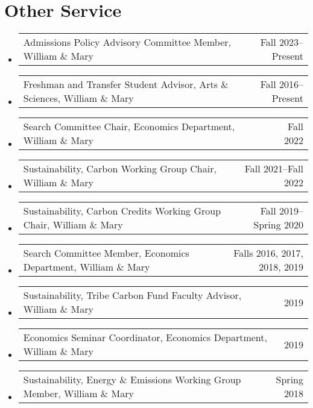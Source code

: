 \documentclass[10pt,letterpaper,en-US]{article}
\makeatletter
\newcommand{\itemrow}[2]
{\begin{tabular*}{\linewidth}{l@{\extracolsep{\fill}}r}
	#1 & #2 \\
\end{tabular*}}
\makeatother
\begin{document}
\section*{Other Service}
\begin{itemize}
    \item \itemrow{Admissions Policy Advisory Committee Member, William \& Mary}{Fall 2023--Present}
    \item \itemrow{Freshman and Transfer Student Advisor, Arts \& Sciences, William \& Mary}{Fall 2016--Present}
    \item \itemrow{Search Committee Chair, Economics Department, William \& Mary}{Fall 2022}
    \item \itemrow{Sustainability, Carbon Working Group Chair, William \& Mary}{Fall 2021--Fall 2022}
    \item \itemrow{Sustainability, Carbon Credits Working Group Chair, William \& Mary}{Fall 2019--Spring 2020}
    \item \itemrow{Search Committee Member, Economics Department, William \& Mary}{Falls 2016, 2017, 2018, 2019}
    \item \itemrow{Sustainability, Tribe Carbon Fund Faculty Advisor, William \& Mary}{2019}
    \item \itemrow{Economics Seminar Coordinator, Economics Department, William \& Mary}{2019}
    \item \itemrow{Sustainability, Energy \& Emissions Working Group Member, William \& Mary}{Spring 2018}
\end{itemize}
\end{document}
